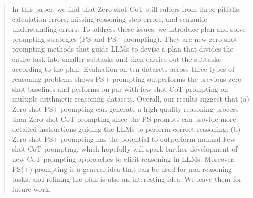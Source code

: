 \documentclass[11pt]{article}
\begin{document}
\begin{abstract}

In this paper, we find that Zero-shot-CoT still suffers from three pitfalls: calculation errors,  missing-reasoning-step errors, and semantic understanding errors.
To address these issues, we introduce plan-and-solve prompting strategies (PS and PS+ prompting). They are new zero-shot prompting methods that guide LLMs to devise a plan that divides the entire task into smaller subtasks and then carries out the subtasks according to the plan.
Evaluation on ten datasets across three types of reasoning problems shows PS+ prompting outperforms the previous zero-shot baselines and performs on par with few-shot CoT prompting on multiple arithmetic reasoning datasets. 
Overall, our results suggest that (a) Zero-shot PS+ prompting can generate a high-quality reasoning process than Zero-shot-CoT prompting since the PS prompts can provide more detailed instructions guiding the LLMs to perform correct reasoning; (b) Zero-shot PS+ prompting has the potential to outperform manual Few-shot CoT prompting, which hopefully will spark further development of new CoT prompting approaches to elicit reasoning in LLMs. 
Moreover, PS(+) prompting is a general idea that can be used for non-reasoning tasks, and refining the plan is also an interesting idea. We leave them for future work.

\end{abstract}
\end{document}
